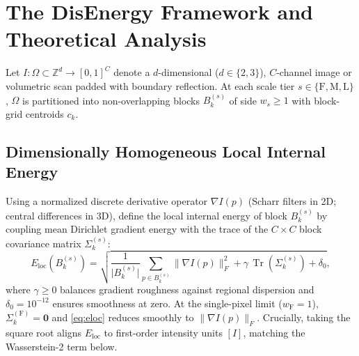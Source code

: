 \section{The DisEnergy Framework and Theoretical Analysis}
\label{sec:theory}

Let $I: \Omega \subset \mathbb{Z}^d \to [0,1]^C$ denote a $d$-dimensional ($d \in \{2,3\}$), $C$-channel image or volumetric scan padded with boundary reflection. At each scale tier $s \in \{\mathrm{F}, \mathrm{M}, \mathrm{L}\}$, $\Omega$ is partitioned into non-overlapping blocks $B_k^{(s)}$ of side $w_s \ge 1$ with block-grid centroids $c_k$.

\subsection{Dimensionally Homogeneous Local Internal Energy}
Using a normalized discrete derivative operator $\nabla I(p)$ (Scharr filters in 2D; central differences in 3D), define the local internal energy of block $B_k^{(s)}$ by coupling mean Dirichlet gradient energy with the trace of the $C \times C$ block covariance matrix $\Sigma_k^{(s)}$:
\begin{equation}
E_{\mathrm{loc}}\!\left(B_k^{(s)}\right) = \sqrt{\frac{1}{\lvert B_k^{(s)}\rvert}\sum_{p \in B_k^{(s)}} \lVert \nabla I(p)\rVert_F^2 + \gamma\,\operatorname{Tr}\!\left(\Sigma_k^{(s)}\right) + \delta_0},
\label{eq:eloc}
\end{equation}
where $\gamma \ge 0$ balances gradient roughness against regional dispersion and $\delta_0 = 10^{-12}$ ensures smoothness at zero. At the single-pixel limit ($w_{\mathrm{F}} = 1$), $\Sigma_k^{(\mathrm{F})} = \mathbf{0}$ and \eqref{eq:eloc} reduces smoothly to $\lVert \nabla I(p)\rVert_F$. Crucially, taking the square root aligns $E_{\mathrm{loc}}$ to first-order intensity units $[I]$, matching the Wasserstein-2 term below.

